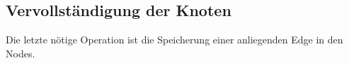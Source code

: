 \subsection{Vervollständigung der Knoten}
Die letzte nötige Operation ist die Speicherung einer anliegenden Edge in den Nodes.\\
